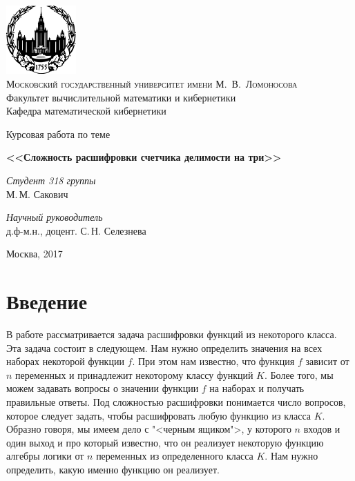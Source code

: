 \documentclass[oneside, final, 14pt]{extreport}
\begin{document}
	\renewcommand\contentsname{Содержание} %
	\thispagestyle{empty}
	
	\begin{center}
		\ \vspace{-1cm}
		
		\includegraphics[width=0.2\textwidth]{logo-mgu.png}\\
		{\scshape Московский государственный университет имени М.~В.~Ломоносова}\\
		Факультет вычислительной математики и кибернетики\\
		Кафедра математической кибернетики
		
		\vfill
		
		{\LARGE Курсовая работа по теме}
		
		\vspace{1cm}
		
		{\Huge\bfseries <<Сложность расшифровки счетчика делимости на три>>}
	\end{center}
	
	\vspace{1cm}
	
	\begin{flushright}
		\large
		\textit{Студент 318 группы}\\
		М.\,М. Сакович
		
		\vspace{5mm}
		
		\textit{Научный руководитель}\\
		д.ф-м.н., доцент. С.\,Н. Селезнева
	\end{flushright}
	
	\vfill
	
	\begin{center}
		Москва, 2017
	\end{center}

	\tableofcontents
	\chapter*{Введение}
	
	В работе рассматривается задача расшифровки функций из некоторого класса. Эта задача состоит в следующем. Нам нужно определить значения 
	на всех наборах некоторой функции $f$. При этом нам известно, что функция $f$ зависит от $n$ переменных и принадлежит некоторому классу
	функций $K$.
	Более того, мы можем задавать вопросы о значении функции $f$ на наборах и получать правильные ответы. Под сложностью расшифровки
	понимается число вопросов, которое следует задать, чтобы расшифровать любую функцию из класса $K$. Образно говоря, мы имеем дело 
	с "<черным ящиком">, у которого $n$ входов и один выход и про который известно, что он реализует некоторую функцию алгебры логики от $n$
	переменных из определенного класса $K$. Нам нужно определить, какую именно функцию он реализует.
	
\end{document}
